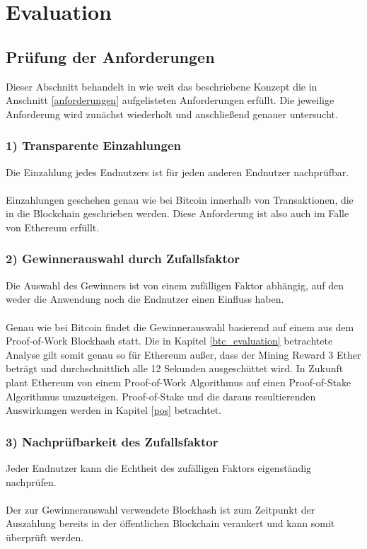 \section{Evaluation}
\subsection{Prüfung der Anforderungen}

Dieser Abschnitt behandelt in wie weit das beschriebene Konzept die in Anschnitt \ref{anforderungen} aufgelisteten Anforderungen erfüllt. Die jeweilige Anforderung wird zunächst wiederholt und anschließend genauer untersucht.

\subsubsection{1) Transparente Einzahlungen}
Die Einzahlung jedes Endnutzers ist für jeden anderen Endnutzer nachprüfbar.\\\\
Einzahlungen geschehen genau wie bei Bitcoin innerhalb von Transaktionen, die in die Blockchain geschrieben werden. Diese Anforderung ist also auch im Falle von Ethereum erfüllt.
\subsubsection{2) Gewinnerauswahl durch Zufallsfaktor}
Die Auswahl des Gewinners ist von einem zufälligen Faktor abhängig, auf den weder die Anwendung noch die Endnutzer einen Einfluss haben.\\\\
Genau wie bei Bitcoin findet die Gewinnerauswahl basierend auf einem aus dem Proof-of-Work Blockhash statt. Die in Kapitel \ref{btc_evaluation} betrachtete Analyse gilt somit genau so für Ethereum außer, dass der Mining Reward 3 Ether beträgt und durchschnittlich alle 12 Sekunden ausgeschüttet wird. In Zukunft plant Ethereum von einem Proof-of-Work Algorithmus auf einen Proof-of-Stake Algorithmus umzusteigen. Proof-of-Stake und die daraus resultierenden Auswirkungen werden in Kapitel \ref{pos} betrachtet.
\subsubsection{3) Nachprüfbarkeit des Zufallsfaktor}
Jeder Endnutzer kann die Echtheit des zufälligen Faktors eigenständig nachprüfen.\\\\
Der zur Gewinnerauswahl verwendete Blockhash ist zum Zeitpunkt der Auszahlung bereits in der öffentlichen Blockchain verankert und kann somit überprüft werden.
